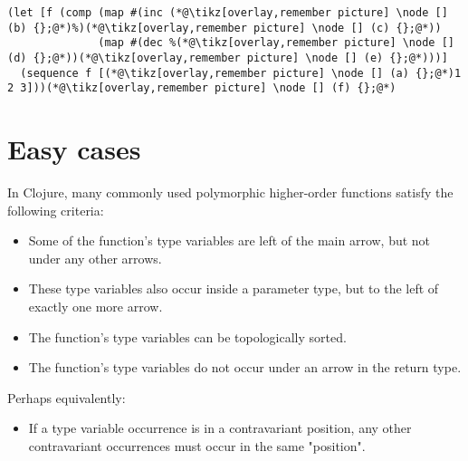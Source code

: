 \documentclass[9pt]{extarticle}
\begin{document}
\begin{lstlisting}
(let [f (comp (map #(inc (*@\tikz[overlay,remember picture] \node [] (b) {};@*)%)(*@\tikz[overlay,remember picture] \node [] (c) {};@*))
              (map #(dec %(*@\tikz[overlay,remember picture] \node [] (d) {};@*))(*@\tikz[overlay,remember picture] \node [] (e) {};@*)))]
  (sequence f [(*@\tikz[overlay,remember picture] \node [] (a) {};@*)1 2 3]))(*@\tikz[overlay,remember picture] \node [] (f) {};@*)
\end{lstlisting}

%

\section{Easy cases}

In Clojure, many commonly used polymorphic higher-order functions satisfy
the following criteria:

\begin{itemize}
  \item Some of the function's type variables are left of the main arrow, but
        not under any other arrows.
  \item These type variables also occur inside a parameter type, but to the left of exactly one more arrow.
  \item The function's type variables can be topologically sorted.
  \item The function's type variables do not occur under an arrow in the return type.
\end{itemize}

Perhaps equivalently:

\begin{itemize}
  \item If a type variable occurrence is in a contravariant position,
        any other contravariant occurrences must occur in the same "position".
\end{itemize}
\end{document}
